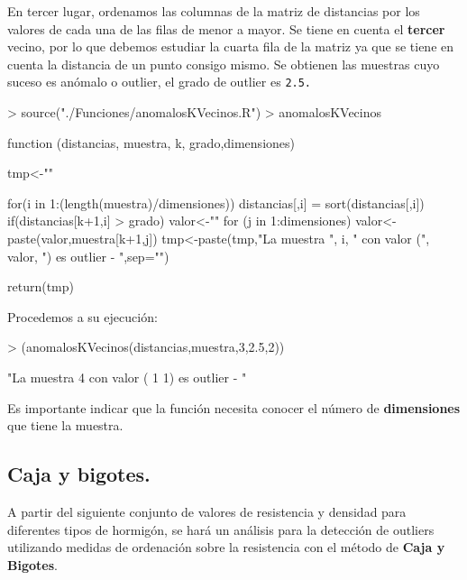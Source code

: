 \documentclass [a4paper] {article}
\begin{document}
\bigskip
En tercer lugar, ordenamos las columnas de la matriz de distancias por los valores de cada una de
las filas de menor a mayor. Se tiene en cuenta el \textbf{tercer} vecino, por lo que debemos estudiar la cuarta 
fila de la matriz ya que se tiene en cuenta la distancia de un punto consigo mismo. Se obtienen las 
muestras cuyo suceso es anómalo o outlier, el grado de outlier es \texttt{2.5.}
\begin{Schunk}
\begin{Sinput}
> source("./Funciones/anomalosKVecinos.R")
> anomalosKVecinos
\end{Sinput}
\begin{Soutput}
function (distancias, muestra, k, grado,dimensiones) {
    tmp<-""

    for(i in 1:(length(muestra)/dimensiones)){
        distancias[,i] = sort(distancias[,i])
        if(distancias[k+1,i] > grado) {
            valor<-""
            for (j in 1:dimensiones){
                valor<-paste(valor,muestra[k+1,j])
            }
            tmp<-paste(tmp,"La muestra ", i, 
                " con valor (", valor, ") es outlier - ",sep="")
        }
    }

    return(tmp)
}
\end{Soutput}
\end{Schunk}

\bigskip
Procedemos a su ejecución:
\begin{Schunk}
\begin{Sinput}
> (anomalosKVecinos(distancias,muestra,3,2.5,2))
\end{Sinput}
\begin{Soutput}
[1] "La muestra 4 con valor ( 1 1) es outlier - "
\end{Soutput}
\end{Schunk}

\bigskip
Es importante indicar que la función necesita conocer el número de \textbf{dimensiones} que tiene
la muestra.

\subsection{Caja y bigotes.}
\bigskip
A partir del siguiente conjunto de valores de resistencia y densidad para diferentes tipos de hormigón,
se hará un análisis para la detección de outliers utilizando medidas de ordenación sobre la resistencia
con el método de \textbf{Caja y Bigotes}.
\end{document}
